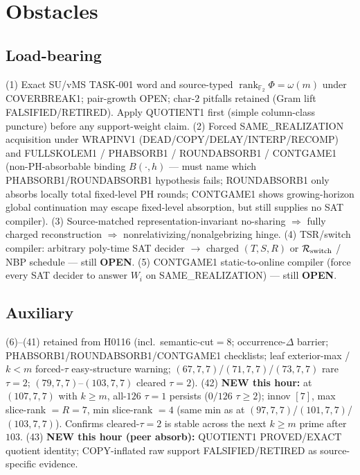 \documentclass[11pt]{article}
\begin{document}
\section*{Obstacles}
\subsection*{Load-bearing}
(1) Exact SU/vMS TASK-001 word and source-typed
$\operatorname{rank}_{\mathbb F_2}\Phi=\omega(m)$ under COVERBREAK1; pair-growth OPEN;
char-$2$ pitfalls retained (Gram lift FALSIFIED/RETIRED). Apply QUOTIENT1 first
(simple column-class puncture) before any support-weight claim.
(2) Forced SAME\_REALIZATION acquisition under WRAPINV1
(DEAD/COPY/DELAY/INTERP/RECOMP) and FULLSKOLEM1 / PHABSORB1 / ROUNDABSORB1 / CONTGAME1
(non-PH-absorbable binding $B(\cdot,h)$ --- must name which PHABSORB1/ROUNDABSORB1
hypothesis fails; ROUNDABSORB1 only absorbs locally total fixed-level PH rounds;
CONTGAME1 shows growing-horizon global continuation may escape fixed-level absorption,
but still supplies no SAT compiler).
(3) Source-matched representation-invariant no-sharing $\Rightarrow$ fully charged reconstruction
$\Rightarrow$ nonrelativizing/nonalgebrizing hinge.
(4) TSR/switch compiler: arbitrary poly-time SAT decider $\to$ charged $(T,S,R)$ or
$\mathcal R_{\rm switch}$ / NBP schedule --- still \textbf{OPEN}.
(5) CONTGAME1 static-to-online compiler (force every SAT decider to answer $W_i$ on
SAME\_REALIZATION) --- still \textbf{OPEN}.

\subsection*{Auxiliary}
(6)--(41) retained from H0116 (incl.\ semantic-cut$=8$; occurrence-$\Delta$ barrier;
PHABSORB1/ROUNDABSORB1/CONTGAME1 checklists; leaf exterior-max / $k{<}m$ forced-$\tau$ easy-structure warning;
$(67,7,7)$/$(71,7,7)$/$(73,7,7)$ rare $\tau{=}2$; $(79,7,7)$--$(103,7,7)$ cleared $\tau{=}2$).
(42) \textbf{NEW this hour:} at $(107,7,7)$ with $k{\ge}m$, all-$126$ $\tau{=}1$ persists
($0/126$ $\tau{\ge}2$); innov $[7]$, max slice-rank $=R{=}7$, min slice-rank $=4$
(same min as at $(97,7,7)$/$(101,7,7)$/$(103,7,7)$). Confirms cleared-$\tau{=}2$
is stable across the next $k{\ge}m$ prime after $103$.
(43) \textbf{NEW this hour (peer absorb):} QUOTIENT1 PROVED/EXACT quotient identity;
COPY-inflated raw support FALSIFIED/RETIRED as source-specific evidence.
\end{document}
